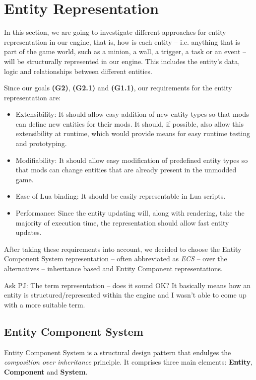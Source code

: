 \section{Entity Representation}

In this section, we are going to investigate different approaches for entity representation in our engine, that is, how is each
entity -- i.e. anything that is part of the game world, such as a minion, a wall, a trigger, a task or an event -- will be
structurally represented in our engine. This includes the entity's data, logic and relationships between different entities.

Since our goals \textbf{(G2)}, \textbf{(G2.1)} and \textbf{(G1.1)}, our requirements for the entity representation are:
\begin{itemize}
    \item Extensibility: It should allow easy addition of new entity types so that mods can define new entities for their mods. It
        should, if possible, also allow this extensibility at runtime, which would provide means for easy runtime testing and prototyping.
    \item Modifiability: It should allow easy modification of predefined entity types so that mods can change entities that are already
        present in the unmodded game.
    \item Ease of Lua binding: It should be easily representable in Lua scripts.
    \item Performance: Since the entity updating will, along with rendering, take the majority of execution time, the representation should
        allow fast entity updates.
\end{itemize}

After taking these requirements into account, we decided to choose the Entity Component System representation
-- often abbreviated as \emph{ECS} -- over
the alternatives -- inheritance based and Entity Component representations.

\bigskip
Ask PJ: The term representation -- does it sound OK? It basically means how an entity is structured/represented within the engine
and I wasn't able to come up with a more suitable term.

\subsection{Entity Component System}

Entity Component System is a structural design pattern that endulges the \emph{composition over inheritance} principle.
It comprises three main elements: \textbf{Entity}, \textbf{Component} and \textbf{System}.

